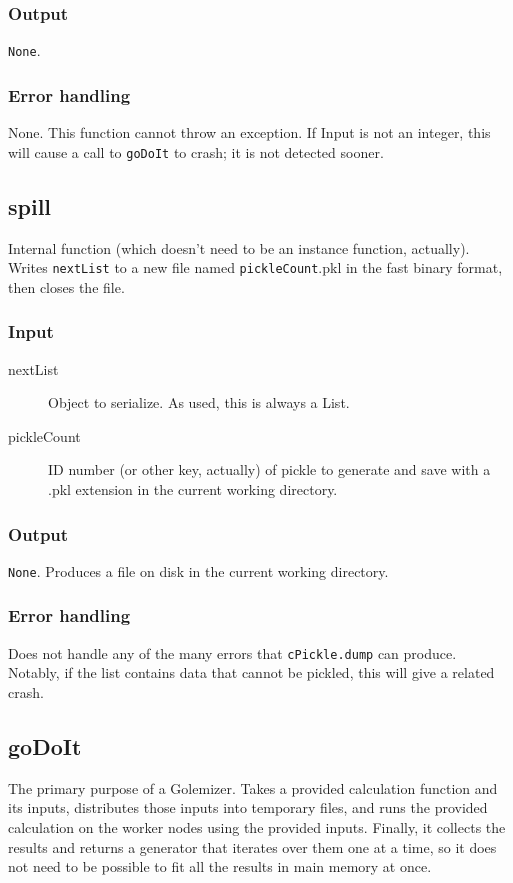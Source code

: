 \documentclass[11pt,ebook,oneside,final]{memoir} %
\begin{document}
\subsubsection*{Output}
\texttt{None}.
\subsubsection*{Error handling}
None. This function cannot throw an exception. If Input is not an integer, this will cause a call to \texttt{goDoIt} to crash; it is not detected sooner.
\subsection{\textunderscore{}spill}
Internal function (which doesn't need to be an instance function, actually). Writes \texttt{nextList} to a new file named \texttt{pickleCount}.pkl in the fast binary format, then closes the file.
\subsubsection*{Input}
\begin{description}
	\item[nextList] Object to serialize. As used, this is always a List.
	\item[pickleCount] ID number (or other key, actually) of pickle to generate and save with a .pkl extension in the current working directory.
\end{description}
\subsubsection*{Output}
\texttt{None}. Produces a file on disk in the current working directory.
\subsubsection*{Error handling}
Does not handle any of the many errors that \texttt{cPickle.dump} can produce. Notably, if the list contains data that cannot be pickled, this will give a related crash.

\subsection{goDoIt}
The primary purpose of a Golemizer. Takes a provided calculation function and its inputs, distributes those inputs into temporary files, and runs the provided calculation on the worker nodes using the provided inputs. Finally, it collects the results and returns a generator that iterates over them one at a time, so it does not need to be possible to fit all the results in main memory at once.
\end{document}
